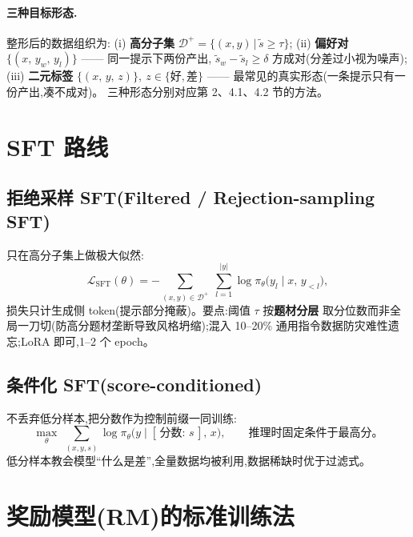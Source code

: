 \documentclass[UTF8, 11pt]{ctexart}
\begin{document}
\paragraph{三种目标形态.} 整形后的数据组织为:
(i) \textbf{高分子集} $\mathcal{D}^{+}=\{(x,y)\,\vert\,\tilde s\ge\tau\}$;
(ii) \textbf{偏好对} $\{(x,\,y_w,\,y_l)\}$ —— 同一提示下两份产出,
$\tilde s_w-\tilde s_l\ge\delta$ 方成对(分差过小视为噪声);
(iii) \textbf{二元标签} $\{(x,\,y,\,z)\},\ z\in\{\text{好},\text{差}\}$ ——
最常见的真实形态(一条提示只有一份产出,凑不成对)。
三种形态分别对应第 2、4.1、4.2 节的方法。

\section{SFT 路线}

\subsection{拒绝采样 SFT(Filtered / Rejection-sampling SFT)}

只在高分子集上做极大似然:
\begin{equation}
\mathcal{L}_{\text{SFT}}(\theta)
=-\sum_{(x,y)\in\mathcal{D}^{+}}\;\sum_{l=1}^{\lvert y\rvert}
\log \pi_\theta\bigl(y_l \mid x,\, y_{<l}\bigr),
\label{eq:sft}
\end{equation}
损失只计生成侧 token(提示部分掩蔽)。要点:阈值 $\tau$ 按\textbf{题材分层}
取分位数而非全局一刀切(防高分题材垄断导致风格坍缩);混入
10--20\% 通用指令数据防灾难性遗忘;LoRA 即可,1--2 个 epoch。

\subsection{条件化 SFT(score-conditioned)}

不丢弃低分样本,把分数作为控制前缀一同训练:
\begin{equation}
\max_\theta\;\sum_{(x,y,s)}\log \pi_\theta\bigl(y \mid [\,\text{分数}{:}\,s\,],\, x\bigr),
\qquad \text{推理时固定条件于最高分。}
\label{eq:condsft}
\end{equation}
低分样本教会模型``什么是差'',全量数据均被利用,数据稀缺时优于过滤式。

\section{奖励模型(RM)的标准训练法}
\end{document}
